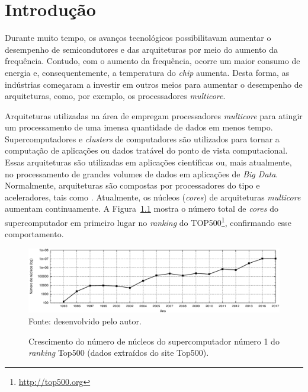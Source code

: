 \chapter{Introdução}
\label{cha:introducao}

Durante muito tempo, os avanços tecnológicos possibilitavam aumentar o
desempenho de semicondutores e das arquiteturas por meio do aumento da
frequência. Contudo, com o aumento da frequência, ocorre um maior consumo de
energia e, consequentemente, a temperatura do \textit{chip} aumenta. Desta
forma, as indústrias começaram a investir em outros meios para aumentar o
desempenho de arquiteturas, como, por exemplo, os processadores \textit{multicore}.

Arquiteturas utilizadas na área de \hpc empregam processadores \textit{multicore} para atingir um
processamento de uma imensa quantidade de dados em menos tempo. Supercomputadores e
\textit{clusters} de computadores são utilizados para tornar a computação de
aplicações ou dados tratável do ponto de vista computacional. Essas arquiteturas
são utilizadas em aplicações científicas ou, mais atualmente, no processamento
de grandes volumes de dados em aplicações de \textit{Big Data}. Normalmente, arquiteturas
\hpc são compostas por processadores do tipo \cpu{} e aceleradores, tais como \gpu.
Atualmente, os núcleos (\textit{cores}) de arquiteturas \textit{multicore}
aumentam continuamente. A Figura~\ref{fig:graphCores} mostra o número total de
\textit{cores} do supercomputador em primeiro lugar no \textit{ranking} do
TOP500\footnote{\url{http://top500.org}}, confirmando esse comportamento.


\begin{figure}[t]
	\centering
	\caption{Crescimento do número de núcleos do supercomputador número 1 do
        \textit{ranking} Top500 (dados extraídos do site Top500).}
	\includegraphics[width=\textwidth]{figs/top500.pdf} \\
    Fonte: desenvolvido pelo autor.
	\label{fig:graphCores}
\end{figure}

